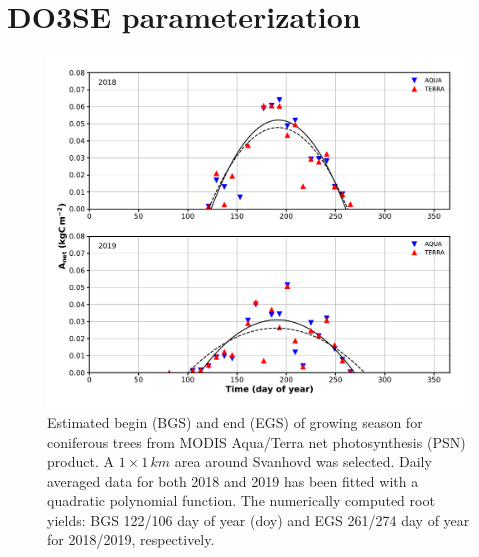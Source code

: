 \documentclass[bg, manuscript]{copernicus}
\begin{document}
\clearpage

\section{DO3SE parameterization}

\begin{figure}[t]
  \includegraphics[width=12cm]{figB1}
  \caption{Estimated begin (BGS) and end (EGS) of growing season for coniferous trees from MODIS Aqua/Terra net photosynthesis (PSN) product. A $1\times 1\,\unit{km}$ area around Svanhovd was selected. Daily averaged data for both 2018 and 2019 has been fitted with a quadratic polynomial function. The numerically computed root yields: BGS 122/106 day of year (\unit{doy}) and EGS 261/274 day of year for 2018/2019, respectively.}
  \label{fig:modis_Psn}
\end{figure}
\end{document}

